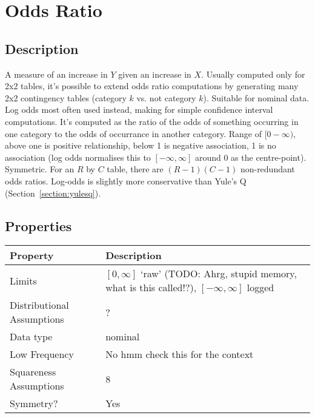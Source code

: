 \documentclass[11pt]{article}
\begin{document}
\section{Odds Ratio}
\label{section:oddsratio}
\subsection{Description}
A measure of an increase in $Y$ given an increase in $X$. %
Usually computed only for 2x2 tables, it's possible to extend odds ratio computations by generating many 2x2 contingency tables (category $k$ vs. not category $k$).  Suitable for nominal data.  %
Log odds most often used instead, making for simple confidence interval computations.  
It's computed as the ratio of the odds of something occurring in one category to the odds of occurrance in another category.  
Range of $[0-\infty)$, above one is positive relationship, below 1 is negative association, 1 is no association (log odds normalises this to $[-\infty, \infty]$ around 0 as the centre-point).  
Symmetric.  
For an $R$ by $C$ table, there are $(R-1)(C-1)$ non-redundant odds ratios.  
Log-odds is slightly more conservative than Yule's Q (Section~\ref{section:yulesq}).



\subsection{Properties}
\begin{tabular}{| l || l |}
    \hline
    {\bf Property} & {\bf Description} \\
    \hline
    Limits & $[0, \infty]$ `raw' (TODO: Ahrg, stupid memory, what is this called!?), $[-\infty, \infty]$ logged \\ \hline

    Distributional Assumptions& ? \\ \hline

    Data type & nominal \\ \hline

    Low Frequency & No {\color{red} hmm check this for the context} \\ \hline

    Squareness Assumptions & 8 \\ \hline
    
    Symmetry? & Yes \\ \hline

\end{tabular}
\end{document}
